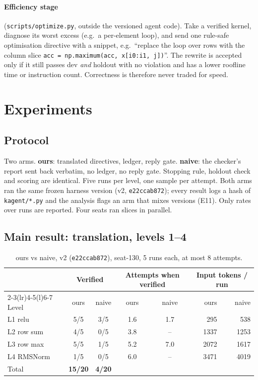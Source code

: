 \documentclass[11pt]{article}
\newcommand{\code}[1]{\texttt{#1}}
\newcommand{\E}[1]{E#1}
\begin{document}
\paragraph{Efficiency stage} (\code{scripts/optimize.py}, outside the versioned agent code). Take a
verified kernel, diagnose its worst excess (e.g.\ a per-element loop), and send one rule-safe
optimisation directive with a snippet, e.g.\ ``replace the loop over rows with the column slice
\code{acc = np.maximum(acc, x[i0:i1, j])}''. The rewrite is accepted only if it still passes dev
\emph{and} holdout with no violation and has a lower roofline time or instruction count. Correctness is
therefore never traded for speed.

\section{Experiments}
\label{sec:exp}

\subsection{Protocol}
Two arms. \textbf{ours}: translated directives, ledger, reply gate. \textbf{naive}: the checker's
report sent back verbatim, no ledger, no reply gate. Stopping rule, holdout check and scoring are
identical. Five runs per level, one sample per attempt. Both arms ran the same frozen harness version
(v2, \code{e22ccab872}); every result logs a hash of \code{kagent/*.py} and the analysis flags an arm
that mixes versions (\E{11}). Only rates over runs are reported. Four seats ran slices in parallel.

\subsection{Main result: translation, levels 1--4}

\begin{table}[h]
\centering
\begin{tabular}{@{}lccccrr@{}}
\toprule
& \multicolumn{2}{c}{Verified} & \multicolumn{2}{c}{Attempts when verified} & \multicolumn{2}{c}{Input tokens / run} \\
\cmidrule(lr){2-3}\cmidrule(lr){4-5}\cmidrule(l){6-7}
Level & ours & naive & ours & naive & ours & naive \\
\midrule
L1 relu & 5/5 & 3/5 & 1.6 & 1.7 & 295 & 538 \\
L2 row sum & 4/5 & 0/5 & 3.8 & -- & 1337 & 1253 \\
L3 row max & 5/5 & 1/5 & 5.2 & 7.0 & 2072 & 1617 \\
L4 RMSNorm & 1/5 & 0/5 & 6.0 & -- & 3471 & 4019 \\
\midrule
Total & \textbf{15/20} & \textbf{4/20} & & & & \\
\bottomrule
\end{tabular}
\caption{ours vs naive, v2 (\code{e22ccab872}), seat-130, 5 runs each, at most 8 attempts.}
\label{tab:main}
\end{table}
\end{document}
